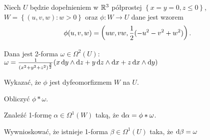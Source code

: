 \documentclass[11pt]{scrartcl}
\begin{document}
    \begin{zadanie*}
        Niech $U$ będzie dopełnieniem w $\mathbb R^3$ półprostej 
        $\left \{ x = y = 0, z \leq 0 \right \}$, 
        $W = \left \{ (u,v, w) : w > 0 \right \}$ oraz $\phi : W \to U$ 
        dane jest wzorem
        \[
            \phi (u, v, w) = \left ( uw, vw, \frac{1}{2} (-u^2 - v^2 + w^2) \right ).
        \]

        Dana jest 2-forma $\omega \in \Omega^2 (U)$: 
        $\omega = \frac{1}{(x^2 + y^2 + z^2)^{\frac{3}{2}}} 
            ( x \, \text{d} y \wedge \text{d} z + 
            y \, \text{d} z \wedge \text{d} x + 
            z \, \text{d} x \wedge \text{d} y)$
        
        \begin{walk}
            \item Wykazać, że $\phi$ jest dyfeomorfizmem $W$ na $U$.
            \item Obliczyć $\phi* \omega$.
            \item Znaleźć 1-formę $\alpha \in \Omega^1 (W)$ taką, że 
                $\text{d} \alpha = \phi* \omega$.
            \item Wywnioskować, że istnieje 1-forma $\beta \in \Omega^1 (U)$ 
                taka, że $\text{d} \beta = \omega$
        \end{walk}
    \end{zadanie*}
\end{document}
